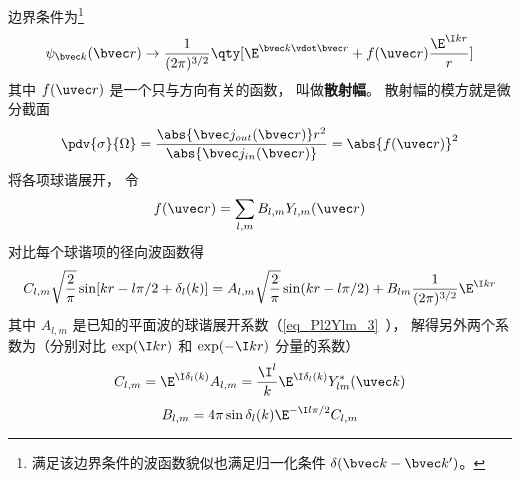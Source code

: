 边界条件为\footnote{满足该边界条件的波函数貌似也满足归一化条件 $\delta(\bvec k - \bvec k')$。}
\begin{equation}
\psi_{\bvec k}(\bvec r) \to \frac{1}{(2\pi)^{3/2}} \qty[\E^{\bvec k \vdot \bvec r} + f(\uvec r) \frac{\E^{\I kr}}{r}]
\end{equation}
其中 $f(\uvec r)$ 是一个只与方向有关的函数， 叫做\textbf{散射幅}。 散射幅的模方就是微分截面
\begin{equation}
\pdv{\sigma}{\Omega} = \frac{\abs{\bvec j_{out}(\bvec r)}r^2}{\abs{\bvec j_{in}(\bvec r)}}
= \abs{f(\uvec r)}^2
\end{equation}
将各项球谐展开， 令
\begin{equation}
f(\uvec r) = \sum_{l, m} B_{l,m} Y_{l,m}(\uvec r)
\end{equation}
对比每个球谐项的径向波函数得
\begin{equation}
C_{l,m} \sqrt{\frac{2}{\pi}} \sin[kr -l\pi/2 + \delta_l(k)] = A_{l,m}  \sqrt{\frac{2}{\pi}} \sin(kr - l \pi/2) + B_{lm} \frac{1}{(2\pi)^{3/2}} \E^{\I kr}
\end{equation}
其中 $A_{l,m}$ 是已知的平面波的球谐展开系数（\autoref{eq_Pl2Ylm_3}~）， 解得另外两个系数为（分别对比 $\exp(\I kr)$ 和 $\exp(-\I kr)$ 分量的系数）
\begin{equation}
C_{l,m} = \E^{\I\delta_l(k)} A_{l, m} = \frac{\I^l}{k} \E^{\I\delta_l(k)} Y_{lm}^*(\uvec k)
\end{equation}
\begin{equation}
B_{l,m} =4\pi \sin\delta_l(k) \E^{-\I l\pi/2} C_{l,m}
\end{equation}
